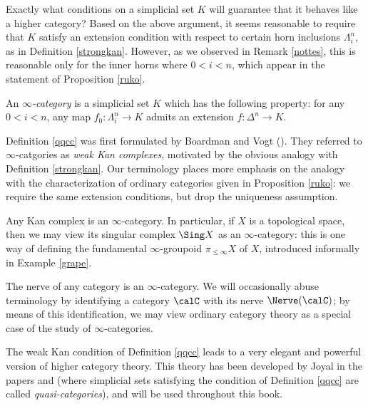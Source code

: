 Exactly what conditions on a simplicial set $K$ will guarantee that it behaves like a higher category? Based on the above argument, it seems reasonable to require that $K$ satisfy an extension condition with respect to certain horn inclusions $\Lambda^n_i$, as in Definition \ref{strongkan}. However, as we observed in Remark \ref{nottes}, this is reasonable only for the inner horns where $0 < i < n$, which appear in the statement of Proposition \ref{ruko}. 

\begin{definition}\label{qqcc}
An {\it $\infty$-category} is a simplicial set $K$ which has the
following property: for any $0 < i < n$, any map $f_0: \Lambda^n_i
\rightarrow K$ admits an extension $f: \Delta^n \rightarrow K$.
\end{definition}

Definition \ref{qqcc} was first formulated by Boardman and Vogt (\cite{quasicat}). They referred to $\infty$-catgories as {\it weak
Kan complexes}, motivated by the obvious analogy with Definition \ref{strongkan}. Our terminology places more emphasis on the analogy with the characterization of ordinary categories given in Proposition \ref{ruko}: we require the same extension conditions, but drop the uniqueness assumption.

\begin{example}
Any Kan complex is an $\infty$-category. In particular, if $X$ is a topological space, then we may view its singular complex $\Sing X$ as an $\infty$-category: this is one way of defining the fundamental $\infty$-groupoid $\pi_{\leq \infty} X$ of $X$, introduced informally in Example \ref{grape}.
\end{example}

\begin{example}
The nerve of any category is an $\infty$-category. We will occasionally abuse terminology by
identifying a category $\calC$ with its nerve $\Nerve(\calC)$; by means of this identification, we may view ordinary category theory as a special case of the study of $\infty$-categories.
\end{example}

The weak Kan condition of Definition \ref{qqcc} leads to a very elegant and powerful version of higher category theory. This theory has been developed by Joyal in the papers \cite{joyalpub} and
\cite{joyalnotpub} (where simplicial sets satisfying the condition of Definition \ref{qqcc} are called
{\it quasi-categories}), and will be used throughout this book.

